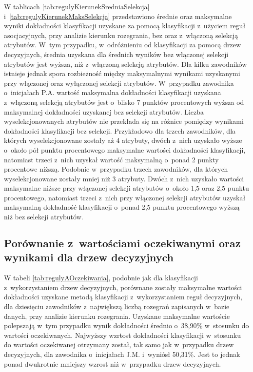 \documentclass[a4paper,twoside,12pt]{book}
\begin{document}
W tablicach \ref{tab:regulyKierunekSredniaSelekcja} i~\ref{tab:regulyKierunekMaksSelekcja} przedstawiono średnie oraz maksymalne wyniki dokładności klasyfikacji uzyskane za pomocą klasyfikacji z~użyciem reguł asocjacyjnych, przy analizie kierunku rozegrania, bez oraz z~włączoną selekcją atrybutów. W~tym przypadku, w~odróżnieniu od klasyfikacji za pomocą drzew decyzyjnych, średnia uzyskana dla średnich wyników bez włączonej selekcji atrybutów jest wyższa, niż z~włączoną selekcją atrybutów. Dla kilku zawodników istnieje jednak spora rozbieżność między maksymalnymi wynikami uzyskanymi przy włączonej oraz wyłączonej selekcji atrybutów. W~przypadku zawodnika o~inicjałach P.A. wartość maksymalna dokładności klasyfikacji uzyskana z~włączoną selekcją atrybutów jest o~blisko 7 punktów procentowych wyższa od maksymalnej dokładności uzyskanej bez selekcji atrybutów. Liczba wyselekcjonowanych atrybutów nie przekłada się na różnice pomiędzy wynikami dokładności klasyfikacji bez selekcji. Przykładowo dla trzech zawodników, dla których wyselekcjonowane zostały aż 4 atrybuty, dwóch z~nich uzyskało wyższe o~około pół punktu procentowego maksymalne wartości dokładności klasyfikacji, natomiast trzeci z~nich uzyskał wartość maksymalną o~ponad 2 punkty procentowe niższą. Podobnie w~przypadku trzech zawodników, dla których wyselekcjonowane zostały mniej niż 3 atrybuty. Dwóch z~nich uzyskało wartości maksymalne niższe przy włączonej selekcji atrybutów o~około 1,5 oraz 2,5 punktu procentowego, natomiast trzeci z~nich przy włączonej selekcji atrybutów uzyskał maksymalną dokładność klasyfikacji o~ponad 2,5 punktu procentowego wyższą niż bez selekcji atrybutów.

\subsection{Porównanie z~wartościami oczekiwanymi oraz wynikami dla drzew decyzyjnych}

W tabeli \ref{tab:regulyAOczekiwania}, podobnie jak dla klasyfikacji z~wykorzystaniem drzew decyzyjnych, porównane zostały maksymalne wartości dokładności uzyskane metodą klasyfikacji z~wykorzystaniem reguł decyzyjnych, dla dziesięciu zawodników z~największą liczbą rozegrań zapisanych w~bazie danych, przy analizie kierunku rozegrania. Uzyskane maksymalne wartoście polepszają w~tym przypadku wynik dokładności średnio o~38,90\% w~stosunku do wartości oczekiwanych. Najwyższy wzrtost dokładności klasyfikacji w~stosunku do wartości oczekiwanej otrzymany został, tak samo jak w~przypadku drzew decyzyjnych, dla zawodnika o~inicjałach J.M. i~wyniósł 50,31\%. Jest to jednak ponad dwukrotnie mniejszy wzrost niż w~przypadku drzew decyzyjnych.
\end{document}

